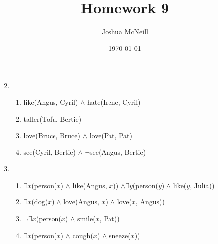 \documentclass{article}
\title{Homework 9}
\author{Joshua McNeill}
\date{\today}
\begin{document}
  \maketitle
  \begin{enumerate}
    \setcounter{enumi}{1}
    \item
    \begin{enumerate}
      \item like(Angus, Cyril) $\land$ hate(Irene, Cyril)
      \item taller(Tofu, Bertie)
      \item love(Bruce, Bruce) $\land$ love(Pat, Pat)
      \item see(Cyril, Bertie) $\land$ $\neg$see(Angus, Bertie)
    \end{enumerate}
    \item
    \begin{enumerate}
      \item $\exists{}x$(person($x$) $\land$ like(Angus, $x$)) $\land \exists{}y$(person($y$) $\land$ like($y$, Julia))
      \item $\exists{}x$(dog($x$) $\land$ love(Angus, $x$) $\land$ love($x$, Angus))
      \item $\neg\exists{}x$(person($x$) $\land$ smile($x$, Pat))
      \item $\exists{}x$(person($x$) $\land$ cough($x$) $\land$ sneeze($x$))
    \end{enumerate}
  \end{enumerate}
\end{document}
